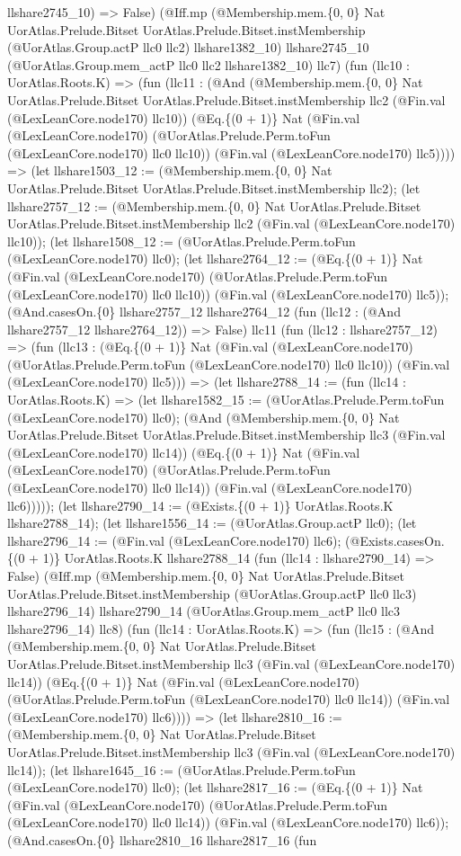 \documentclass[11pt]{article}
\begin{document}
llshare2745\_10) => False) (@Iff.mp (@Membership.mem.\{0, 0\} Nat UorAtlas.Prelude.Bitset UorAtlas.Prelude.Bitset.instMembership (@UorAtlas.Group.actP llc0 llc2) llshare1382\_10) llshare2745\_10 (@UorAtlas.Group.mem\_actP llc0 llc2 llshare1382\_10) llc7) (fun (llc10 : UorAtlas.Roots.K) => (fun (llc11 : (@And (@Membership.mem.\{0, 0\} Nat UorAtlas.Prelude.Bitset UorAtlas.Prelude.Bitset.instMembership llc2 (@Fin.val (@LexLeanCore.node170) llc10)) (@Eq.\{(0 + 1)\} Nat (@Fin.val (@LexLeanCore.node170) (@UorAtlas.Prelude.Perm.toFun (@LexLeanCore.node170) llc0 llc10)) (@Fin.val (@LexLeanCore.node170) llc5)))) => (let llshare1503\_12 := (@Membership.mem.\{0, 0\} Nat UorAtlas.Prelude.Bitset UorAtlas.Prelude.Bitset.instMembership llc2); (let llshare2757\_12 := (@Membership.mem.\{0, 0\} Nat UorAtlas.Prelude.Bitset UorAtlas.Prelude.Bitset.instMembership llc2 (@Fin.val (@LexLeanCore.node170) llc10)); (let llshare1508\_12 := (@UorAtlas.Prelude.Perm.toFun (@LexLeanCore.node170) llc0); (let llshare2764\_12 := (@Eq.\{(0 + 1)\} Nat (@Fin.val (@LexLeanCore.node170) (@UorAtlas.Prelude.Perm.toFun (@LexLeanCore.node170) llc0 llc10)) (@Fin.val (@LexLeanCore.node170) llc5)); (@And.casesOn.\{0\} llshare2757\_12 llshare2764\_12 (fun (llc12 : (@And llshare2757\_12 llshare2764\_12)) => False) llc11 (fun (llc12 : llshare2757\_12) => (fun (llc13 : (@Eq.\{(0 + 1)\} Nat (@Fin.val (@LexLeanCore.node170) (@UorAtlas.Prelude.Perm.toFun (@LexLeanCore.node170) llc0 llc10)) (@Fin.val (@LexLeanCore.node170) llc5))) => (let llshare2788\_14 := (fun (llc14 : UorAtlas.Roots.K) => (let llshare1582\_15 := (@UorAtlas.Prelude.Perm.toFun (@LexLeanCore.node170) llc0); (@And (@Membership.mem.\{0, 0\} Nat UorAtlas.Prelude.Bitset UorAtlas.Prelude.Bitset.instMembership llc3 (@Fin.val (@LexLeanCore.node170) llc14)) (@Eq.\{(0 + 1)\} Nat (@Fin.val (@LexLeanCore.node170) (@UorAtlas.Prelude.Perm.toFun (@LexLeanCore.node170) llc0 llc14)) (@Fin.val (@LexLeanCore.node170) llc6))))); (let llshare2790\_14 := (@Exists.\{(0 + 1)\} UorAtlas.Roots.K llshare2788\_14); (let llshare1556\_14 := (@UorAtlas.Group.actP llc0); (let llshare2796\_14 := (@Fin.val (@LexLeanCore.node170) llc6); (@Exists.casesOn.\{(0 + 1)\} UorAtlas.Roots.K llshare2788\_14 (fun (llc14 : llshare2790\_14) => False) (@Iff.mp (@Membership.mem.\{0, 0\} Nat UorAtlas.Prelude.Bitset UorAtlas.Prelude.Bitset.instMembership (@UorAtlas.Group.actP llc0 llc3) llshare2796\_14) llshare2790\_14 (@UorAtlas.Group.mem\_actP llc0 llc3 llshare2796\_14) llc8) (fun (llc14 : UorAtlas.Roots.K) => (fun (llc15 : (@And (@Membership.mem.\{0, 0\} Nat UorAtlas.Prelude.Bitset UorAtlas.Prelude.Bitset.instMembership llc3 (@Fin.val (@LexLeanCore.node170) llc14)) (@Eq.\{(0 + 1)\} Nat (@Fin.val (@LexLeanCore.node170) (@UorAtlas.Prelude.Perm.toFun (@LexLeanCore.node170) llc0 llc14)) (@Fin.val (@LexLeanCore.node170) llc6)))) => (let llshare2810\_16 := (@Membership.mem.\{0, 0\} Nat UorAtlas.Prelude.Bitset UorAtlas.Prelude.Bitset.instMembership llc3 (@Fin.val (@LexLeanCore.node170) llc14)); (let llshare1645\_16 := (@UorAtlas.Prelude.Perm.toFun (@LexLeanCore.node170) llc0); (let llshare2817\_16 := (@Eq.\{(0 + 1)\} Nat (@Fin.val (@LexLeanCore.node170) (@UorAtlas.Prelude.Perm.toFun (@LexLeanCore.node170) llc0 llc14)) (@Fin.val (@LexLeanCore.node170) llc6)); (@And.casesOn.\{0\} llshare2810\_16 llshare2817\_16 (fun 
\end{document}
